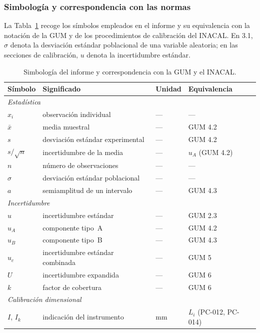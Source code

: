 \subsubsection{Simbología y correspondencia con las normas}
\label{sec:simbologia}

La Tabla~\ref{tab:simbologia} recoge los símbolos empleados en el informe y su
equivalencia con la notación de la GUM y de los procedimientos de calibración del
INACAL. En 3.1, $\sigma$ denota la desviación estándar poblacional de una variable
aleatoria; en las secciones de calibración, $u$ denota la incertidumbre estándar.

\begin{table}[H]
\centering
\small
\renewcommand{\arraystretch}{1.15}
\caption{Simbología del informe y correspondencia con la GUM y el INACAL.}
\label{tab:simbologia}
\begin{tabular}{@{}p{2.5cm}p{7.3cm}p{1.3cm}p{4.1cm}@{}}
\toprule
Símbolo & Significado & Unidad & Equivalencia \\
\midrule
\multicolumn{4}{l}{\textit{Estadística}} \\
$x_i$ & observación individual & --- & --- \\
$\bar{x}$ & media muestral & --- & GUM 4.2 \\
$s$ & desviación estándar experimental & --- & GUM 4.2 \\
$s/\sqrt{n}$ & incertidumbre de la media & --- & $u_A$ (GUM 4.2) \\
$n$ & número de observaciones & --- & --- \\
$\sigma$ & desviación estándar poblacional & --- & --- \\
$a$ & semiamplitud de un intervalo & --- & GUM 4.3 \\
\midrule
\multicolumn{4}{l}{\textit{Incertidumbre}} \\
$u$ & incertidumbre estándar & --- & GUM 2.3 \\
$u_A$ & componente tipo~A & --- & GUM 4.2 \\
$u_B$ & componente tipo~B & --- & GUM 4.3 \\
$u_c$ & incertidumbre estándar combinada & --- & GUM 5 \\
$U$ & incertidumbre expandida & --- & GUM 6 \\
$k$ & factor de cobertura & --- & GUM 6 \\
\midrule
\multicolumn{4}{l}{\textit{Calibración dimensional}} \\
$I$, $I_k$ & indicación del instrumento & mm & $L_i$ (PC-012, PC-014) \\

\end{tabular}
\end{table}
